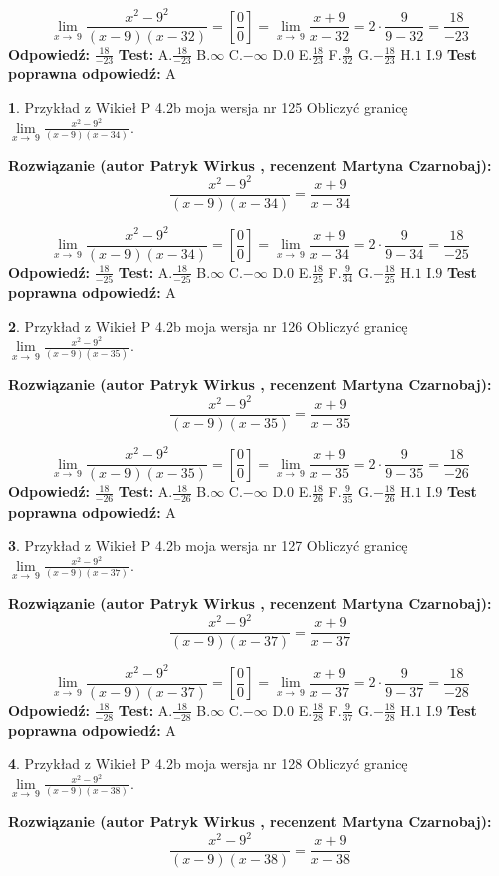 \documentclass[12pt, a4paper]{article}
\theoremstyle{definition} %
\newtheorem{zad}{}
\newcommand{\zadStart}[1]{\begin{zad}#1\newline}
\newcommand{\zadStop}{\end{zad}}
\newcommand{\rozwStart}[2]{\noindent \textbf{Rozwiązanie (autor #1 , recenzent #2): }\newline}
\newcommand{\rozwStop}{\newline}
\newcommand{\odpStart}{\noindent \textbf{Odpowiedź:}\newline}
\newcommand{\odpStop}{\newline}
\newcommand{\testStart}{\noindent \textbf{Test:}\newline}
\newcommand{\testStop}{\newline}
\newcommand{\kluczStart}{\noindent \textbf{Test poprawna odpowiedź:}\newline}
\newcommand{\kluczStop}{\newline}
\begin{document}
$$\lim\limits_{x\to\ 9}\frac{x^{2}-9^{2}}{(x-9)(x-32)}=[\frac{0}{0}]=\lim\limits_{x\to\ 9}\frac{x+9}{x-32}=2 \cdot \frac{9}{9-32} = \frac{18}{-23}$$
\rozwStop
\odpStart
$\frac{18}{-23}$
\odpStop
\testStart
A.$\frac{18}{-23}$
B.$\infty$
C.$-\infty$
D.$0$
E.$\frac{18}{23}$
F.$\frac{9}{32}$
G.$-\frac{18}{23}$
H.$1$
I.$9$
\testStop
\kluczStart
A
\kluczStop



\zadStart{Przykład z Wikieł P 4.2b moja wersja nr 125}
Obliczyć granicę $\lim\limits_{x\to\ 9}\frac{x^{2}-9^{2}}{(x-9)(x-34)}$.
\zadStop
\rozwStart{Patryk Wirkus}{Martyna Czarnobaj}
$$\frac{x^{2}-9^{2}}{(x-9)(x-34)}=\frac{x+9}{x-34}$$

$$\lim\limits_{x\to\ 9}\frac{x^{2}-9^{2}}{(x-9)(x-34)}=[\frac{0}{0}]=\lim\limits_{x\to\ 9}\frac{x+9}{x-34}=2 \cdot \frac{9}{9-34} = \frac{18}{-25}$$
\rozwStop
\odpStart
$\frac{18}{-25}$
\odpStop
\testStart
A.$\frac{18}{-25}$
B.$\infty$
C.$-\infty$
D.$0$
E.$\frac{18}{25}$
F.$\frac{9}{34}$
G.$-\frac{18}{25}$
H.$1$
I.$9$
\testStop
\kluczStart
A
\kluczStop



\zadStart{Przykład z Wikieł P 4.2b moja wersja nr 126}
Obliczyć granicę $\lim\limits_{x\to\ 9}\frac{x^{2}-9^{2}}{(x-9)(x-35)}$.
\zadStop
\rozwStart{Patryk Wirkus}{Martyna Czarnobaj}
$$\frac{x^{2}-9^{2}}{(x-9)(x-35)}=\frac{x+9}{x-35}$$

$$\lim\limits_{x\to\ 9}\frac{x^{2}-9^{2}}{(x-9)(x-35)}=[\frac{0}{0}]=\lim\limits_{x\to\ 9}\frac{x+9}{x-35}=2 \cdot \frac{9}{9-35} = \frac{18}{-26}$$
\rozwStop
\odpStart
$\frac{18}{-26}$
\odpStop
\testStart
A.$\frac{18}{-26}$
B.$\infty$
C.$-\infty$
D.$0$
E.$\frac{18}{26}$
F.$\frac{9}{35}$
G.$-\frac{18}{26}$
H.$1$
I.$9$
\testStop
\kluczStart
A
\kluczStop



\zadStart{Przykład z Wikieł P 4.2b moja wersja nr 127}
Obliczyć granicę $\lim\limits_{x\to\ 9}\frac{x^{2}-9^{2}}{(x-9)(x-37)}$.
\zadStop
\rozwStart{Patryk Wirkus}{Martyna Czarnobaj}
$$\frac{x^{2}-9^{2}}{(x-9)(x-37)}=\frac{x+9}{x-37}$$

$$\lim\limits_{x\to\ 9}\frac{x^{2}-9^{2}}{(x-9)(x-37)}=[\frac{0}{0}]=\lim\limits_{x\to\ 9}\frac{x+9}{x-37}=2 \cdot \frac{9}{9-37} = \frac{18}{-28}$$
\rozwStop
\odpStart
$\frac{18}{-28}$
\odpStop
\testStart
A.$\frac{18}{-28}$
B.$\infty$
C.$-\infty$
D.$0$
E.$\frac{18}{28}$
F.$\frac{9}{37}$
G.$-\frac{18}{28}$
H.$1$
I.$9$
\testStop
\kluczStart
A
\kluczStop



\zadStart{Przykład z Wikieł P 4.2b moja wersja nr 128}
Obliczyć granicę $\lim\limits_{x\to\ 9}\frac{x^{2}-9^{2}}{(x-9)(x-38)}$.
\zadStop
\rozwStart{Patryk Wirkus}{Martyna Czarnobaj}
$$\frac{x^{2}-9^{2}}{(x-9)(x-38)}=\frac{x+9}{x-38}$$
\end{document}
